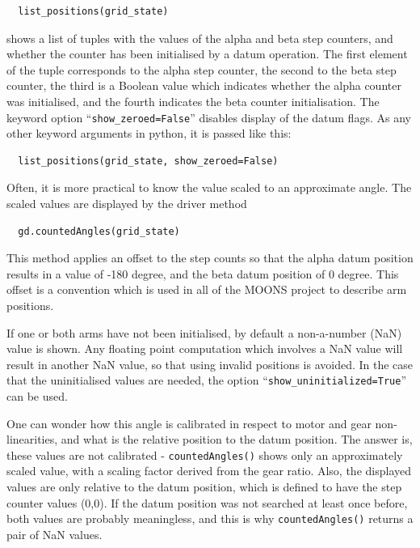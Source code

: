 \documentclass[fontsize=12,a4paper]{scrreprt}
\begin{document}
\begin{verbatim}
  list_positions(grid_state)
\end{verbatim}

shows a list of tuples with the values of the alpha and beta step
counters, and whether the counter has been initialised by a datum
operation. The first element of the tuple corresponds to the alpha
step counter, the second to the beta step counter, the third is a
Boolean value which indicates whether the alpha counter was
initialised, and the fourth indicates the beta counter
initialisation. The keyword option ``\texttt{show\_zeroed=False}''
disables display of the datum flags.  As any other keyword arguments
in python, it is passed like this:

\begin{verbatim}
  list_positions(grid_state, show_zeroed=False)
\end{verbatim}



Often, it is more practical to know the value scaled to an approximate
angle. The scaled values are displayed by the driver method
\begin{verbatim}
  gd.countedAngles(grid_state)
\end{verbatim}
This method applies an offset to the step counts so that the alpha
datum position results in a value of -180 degree, and the beta datum
position of 0 degree. This offset is a convention which is used in all
of the MOONS project to describe arm positions.


If one or both arms have not been initialised, by default a
non-a-number (NaN) value is shown. Any floating point computation
which involves a NaN value will result in another NaN value, so that
using invalid positions is avoided.  In the case that the
uninitialised values are needed, the option
``\texttt{show\_uninitialized=True}'' can be used.


One can wonder how this angle is calibrated in respect to motor and
gear non-linearities, and what is the relative position to the datum
position. The answer is, these values are not calibrated -
\texttt{countedAngles()} shows only an approximately scaled value,
with a scaling factor derived from the gear ratio.  Also, the
displayed values are only relative to the datum position, which is
defined to have the step counter values (0,0). If the datum position
was not searched at least once before, both values are probably
meaningless, and this is why \texttt{countedAngles()} returns a pair
of NaN values.
\end{document}
